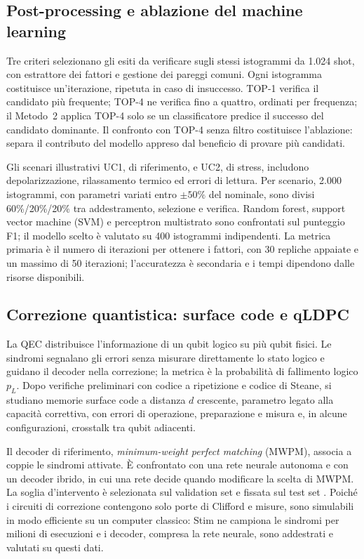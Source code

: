 \subsection{Post-processing e ablazione del machine learning}

Tre criteri selezionano gli esiti da verificare sugli stessi istogrammi da 1.024 shot, con
estrattore dei fattori e gestione dei pareggi comuni. Ogni istogramma costituisce
un'iterazione, ripetuta in caso di insuccesso. TOP-1 verifica il candidato più frequente;
TOP-4 ne verifica fino a quattro, ordinati per frequenza; il Metodo~2 applica TOP-4 solo se un
classificatore predice il successo del candidato dominante. Il confronto con TOP-4 senza
filtro costituisce l'ablazione: separa il contributo del modello appreso dal beneficio di
provare più candidati.

Gli scenari illustrativi UC1, di riferimento, e UC2, di stress, includono depolarizzazione,
rilassamento termico ed errori di lettura. Per scenario, 2.000 istogrammi, con parametri
variati entro \(\pm50\%\) del nominale, sono divisi 60\%/20\%/20\% tra addestramento,
selezione e verifica. Random forest, support vector machine (SVM) e perceptron multistrato
sono confrontati sul punteggio F1; il modello scelto è valutato su 400 istogrammi
indipendenti. La metrica primaria è il numero di iterazioni per ottenere i fattori, con 30
repliche appaiate e un massimo di 50 iterazioni; l'accuratezza è secondaria e i tempi
dipendono dalle risorse disponibili.

\subsection{Correzione quantistica: surface code e qLDPC}

La QEC distribuisce l'informazione di un qubit logico su più qubit fisici. Le sindromi
segnalano gli errori senza misurare direttamente lo stato logico e guidano il decoder nella
correzione; la metrica è la probabilità di fallimento logico \(p_L\). Dopo verifiche
preliminari con codice a ripetizione e codice di Steane, si studiano memorie surface code
\cite{steane1996,fowler2012,googleQECBelowThreshold2025} a distanza \(d\) crescente, parametro
legato alla capacità correttiva, con errori di operazione, preparazione e misura e, in alcune
configurazioni, crosstalk tra qubit adiacenti.

Il decoder di riferimento, \emph{minimum-weight perfect matching} (MWPM), associa a coppie le
sindromi attivate. È confrontato con una rete neurale autonoma e con un decoder ibrido, in cui
una rete decide quando modificare la scelta di MWPM. La soglia d'intervento è selezionata sul
validation set e fissata sul test set \cite{alphaqubit2024}. Poiché i circuiti di correzione
contengono solo porte di Clifford e misure, sono simulabili in modo efficiente su un computer
classico: Stim ne campiona le sindromi per milioni di esecuzioni e i decoder, compresa la rete
neurale, sono addestrati e valutati su questi dati.


